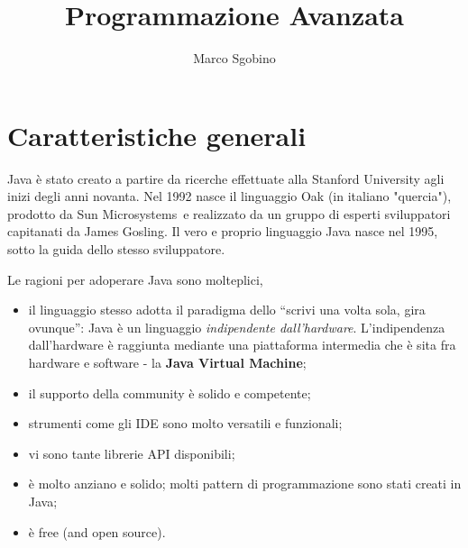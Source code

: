 \documentclass[\fontsizeclass,twocolumn]{\classname}
\theoremstyle{definition}
\theoremstyle{definition}
\begin{document}
%
\title{Programmazione Avanzata}
\author{Marco Sgobino}
\maketitle

\setstretch{\spacingvalue}
\setlength{\emergencystretch}{0pt}
\hfuzz=0pt
\setlength{\headsep}{\headsepvalue}
\setlength{\footskip}{\footskipvalue}
\setlength{\marginparsep}{\marginparsepvalue}
\setlength{\marginparwidth}{\marginparwidthvalue}

\tableofcontents


%

\chapter{Caratteristiche generali}

Java è stato creato a partire da ricerche effettuate alla Stanford University
agli inizi degli anni novanta. Nel 1992 nasce il linguaggio Oak (in italiano
"quercia"), prodotto da Sun Microsystems\texttrademark\  e realizzato da un
gruppo di esperti sviluppatori capitanati da James Gosling. Il vero e proprio
linguaggio Java nasce nel 1995, sotto la guida dello stesso sviluppatore. 

Le ragioni per adoperare Java sono molteplici,

\begin{itemize}
    \item il linguaggio stesso adotta il paradigma dello ``scrivi una volta
        sola, gira ovunque'': Java è un linguaggio \emph{indipendente
        dall'hardware}. L'indipendenza dall'hardware è raggiunta mediante una
        piattaforma intermedia che è sita fra hardware e software \-- la
        \textbf{Java Virtual Machine};
	\item il supporto della community è solido e competente;
	\item strumenti come gli IDE sono molto versatili e funzionali;
	\item vi sono tante librerie API disponibili;
	\item è molto anziano e solido; molti pattern di programmazione sono stati
		creati in Java;
	\item è free (and open source).
\end{itemize}
\end{document}
